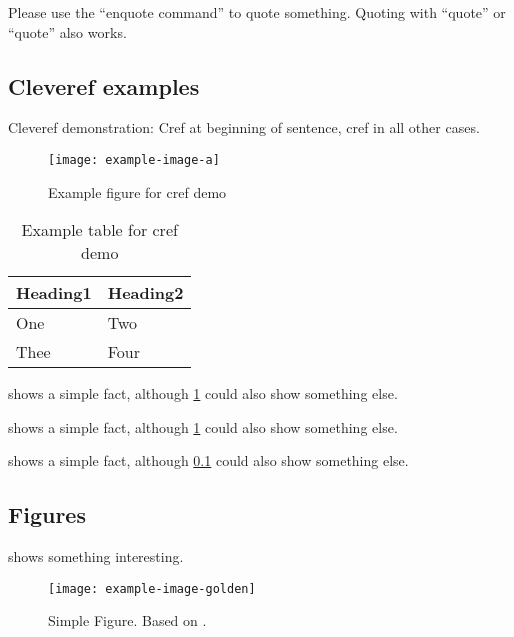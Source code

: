 \documentclass[runningheads,a4paper,english]{llncs}[2022/01/12]
\begin{document}
\begin{ltgexample}
Please use the \enquote{enquote command} to quote something.
Quoting with "`quote"' or ``quote'' also works.

\end{ltgexample}

\subsection{Cleveref examples}
\label{sec:ex:cref}

Cleveref demonstration: Cref at beginning of sentence, cref in all other cases.

\begin{figure}
    \centering
    \texttt{[image: example-image-a]}
    \caption{Example figure for cref demo}
    \label{fig:ex:cref}
\end{figure}

\begin{table}
    \centering
    \begin{tabular}{ll}
      \toprule
      Heading1 & Heading2 \\
      \midrule
      One      & Two      \\
      Thee     & Four     \\
      \bottomrule
    \end{tabular}
    \caption{Example table for cref demo}
    \label{tab:ex:cref}
\end{table}

\begin{ltgexample}
 shows a simple fact, although \cref{fig:ex:cref} could also show something else.

 shows a simple fact, although \cref{tab:ex:cref} could also show something else.

 shows a simple fact, although \cref{sec:ex:cref} could also show something else.
\end{ltgexample}

\subsection{Figures}

\begin{ltgexample}
 shows something interesting.

\begin{figure}
  \centering
  \texttt{[image: example-image-golden]}
  \caption[Simple Figure]{Simple Figure. Based on \citet{mwe}.}
  \label{fig:label}
\end{figure}
\end{ltgexample}
\end{document}
